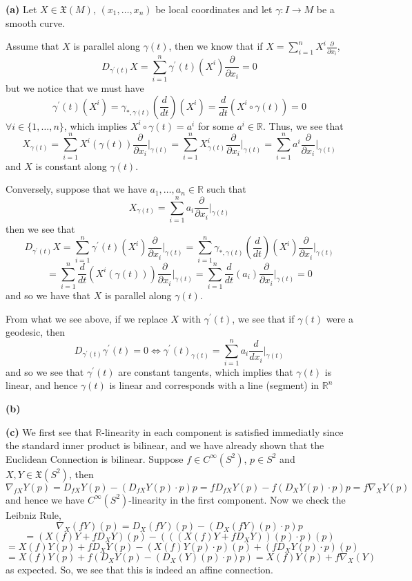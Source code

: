 \documentclass[10pt]{article}
\newcommand{\R}{\mathbb{R}}
\newcommand{\di}[2][]{\frac{\partial #1}{\partial #2}}
\newcommand{\del}[2][]{\frac{d #1}{d #2}}
\begin{document}
\textbf{(a)} Let $X\in \mathfrak{X}(M)$, $(x_{1},\dots,x_{n})$ be local coordinates and let $\gamma:I\to M$ be a smooth curve.

Assume that $X$ is parallel along $\gamma(t)$, then we know that if $X = \sum_{i=1}^{n}X^{i}\di{x_{i}}$,
\[ D_{\gamma^{\prime}(t)}X = \sum_{i=1}^{n}\gamma^{\prime}(t)(X^{i})\di{x_{i}} = 0 \]
but we notice that we must have
\[ \gamma^{\prime}(t)(X^{i}) = \gamma_{*,\gamma(t)}\left(\del{t}\right)(X^{i}) = \del{t}(X^{i}\circ \gamma(t)) = 0 \]
$\forall i \in \{1,\dots,n\}$, which implies $X^{i}\circ\gamma(t) = a^{i}$ for some $a^{i}\in \R$. Thus, we see that
\[  X_{\gamma(t)} = \sum_{i=1}^{n}X^{i}(\gamma(t))\di{x_{i}}\bigg|_{\gamma(t)} = \sum_{i=1}^{n}X^{i}_{\gamma(t)}\di{x_{i}}\bigg|_{\gamma(t)} = \sum_{i=1}^{n}a^{i}\di{x_{i}}\bigg|_{\gamma(t)}\]
and $X$ is constant along $\gamma(t)$.

Conversely, suppose that we have $a_{1},\dots,a_{n}\in \R$ such that
\[ X_{\gamma(t)} = \sum_{i=1}^{n}a_{i}\di{x_{i}}\bigg|_{\gamma(t)} \]
then we see that
\[ D_{\gamma^{\prime}(t)}X = \sum_{i=1}^{n}\gamma^{\prime}(t)(X^{i})\di{x_{i}}\bigg|_{\gamma(t)} = \sum_{i=1}^{n}\gamma_{*,\gamma(t)}(\del{t})(X^{i})\di{x_{i}}\bigg|_{\gamma(t)} \]
\[= \sum_{i=1}^{n}\del{t}(X^{i}(\gamma(t)))\di{x_{i}}\bigg|_{\gamma(t)} = \sum_{i=1}^{n}\del{t}(a_{i})\di{x_{i}}\bigg|_{\gamma(t)} = 0\]
and so we have that $X$ is parallel along $\gamma(t)$.

From what we see above, if we replace $X$ with $\gamma^{\prime}(t)$, we see that if $\gamma(t)$ were a geodesic,
then
\[ D_{\gamma^{\prime}(t)}\gamma^{\prime}(t) = 0 \iff \gamma^{\prime}(t)_{\gamma(t)} = \sum_{i=1}^{n}a_{i}\del{x_{i}}\bigg|_{\gamma(t)} \]
and so we see that $\gamma^{\prime}(t)$ are constant tangents, which implies that $\gamma(t)$ is linear, and hence $\gamma(t)$ is linear and corresponds with a line (segment) in $\R^{n}$

\textbf{(b)}

\textbf{(c)} We first see that $\R$-linearity in each component is satisfied immediatly since the standard inner product is bilinear, and we have already shown that the Euclidean Connection is bilinear. Suppose $f\in C^{\infty}(S^{2})$, $p\in S^{2}$ and $X,Y\in \mathfrak{X}(S^{2})$, then
\[ \nabla_{fX}Y(p) = D_{fX}Y(p) - (D_{fX}Y(p) \cdot p)p = fD_{fX}Y(p) - f(D_{X}Y(p) \cdot p)p = f\nabla_{X}Y(p) \]
and hence we have $C^{\infty}(S^{2})$-linearity in the first component. Now we check the Leibniz Rule,
\[ \nabla_{X}(fY)(p) = D_{X}(fY)(p) - (D_{X}(fY)(p) \cdot p)p\]
\[ = (X(f)Y + fD_{X}Y)(p) - (((X(f)Y + fD_{X}Y))(p) \cdot p)(p)\]
\[ = X(f)Y(p) + fD_{X}Y(p) - (X(f)Y(p)\cdot p)(p) + (fD_{X}Y(p) \cdot p)(p)\]
\[= X(f)Y(p) + f(D_{X}Y(p) - (D_{X}(Y)(p) \cdot p)p) = X(f)Y(p) + f\nabla_{X}(Y) \]
as expected. So, we see that this is indeed an affine connection.
\end{document}
